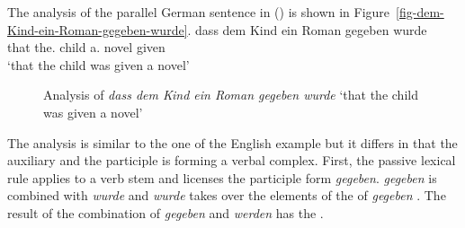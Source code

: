The analysis of the parallel German sentence in () is shown in
Figure~\vref{fig-dem-Kind-ein-Roman-gegeben-wurde}.
\ea
\gll dass dem Kind ein Roman gegeben wurde\\
     that the.\DAT{} child a.\NOM{} novel  given    \AUX\\\german
\glt `that the child was given a novel'
\z

\begin{figure}
\caption{\label{fig-dem-Kind-ein-Roman-gegeben-wurde}Analysis of \emph{dass dem Kind ein Roman gegeben
    wurde} `that the child was given a novel'}
\end{figure}

\noindent
The analysis is similar to the one of the English example but it differs in that the auxiliary and
the participle is forming a verbal complex. First, the passive lexical rule applies to a verb stem
 and licenses the participle form \emph{gegeben}. \emph{gegeben}  is combined with
\emph{wurde} and \emph{wurde} takes over the elements of the \compsl of \emph{gegeben} . The result of the combination of \emph{gegeben} and \emph{werden} has the
\compsl {}.


